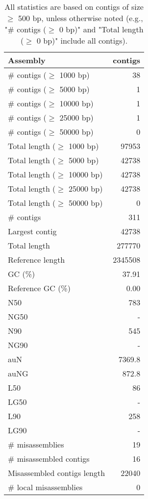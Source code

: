 \documentclass[12pt,a4paper]{article}
\begin{document}
\begin{table}[ht]
\begin{center}
\caption{All statistics are based on contigs of size $\geq$ 500 bp, unless otherwise noted (e.g., "\# contigs ($\geq$ 0 bp)" and "Total length ($\geq$ 0 bp)" include all contigs).}
\begin{tabular}{|l*{1}{|r}|}
\hline
Assembly & contigs \\ \hline
\# contigs ($\geq$ 1000 bp) & 38 \\ \hline
\# contigs ($\geq$ 5000 bp) & 1 \\ \hline
\# contigs ($\geq$ 10000 bp) & 1 \\ \hline
\# contigs ($\geq$ 25000 bp) & 1 \\ \hline
\# contigs ($\geq$ 50000 bp) & 0 \\ \hline
Total length ($\geq$ 1000 bp) & 97953 \\ \hline
Total length ($\geq$ 5000 bp) & 42738 \\ \hline
Total length ($\geq$ 10000 bp) & 42738 \\ \hline
Total length ($\geq$ 25000 bp) & 42738 \\ \hline
Total length ($\geq$ 50000 bp) & 0 \\ \hline
\# contigs & 311 \\ \hline
Largest contig & 42738 \\ \hline
Total length & 277770 \\ \hline
Reference length & 2345508 \\ \hline
GC (\%) & 37.91 \\ \hline
Reference GC (\%) & 0.00 \\ \hline
N50 & 783 \\ \hline
NG50 & - \\ \hline
N90 & 545 \\ \hline
NG90 & - \\ \hline
auN & 7369.8 \\ \hline
auNG & 872.8 \\ \hline
L50 & 86 \\ \hline
LG50 & - \\ \hline
L90 & 258 \\ \hline
LG90 & - \\ \hline
\# misassemblies & 19 \\ \hline
\# misassembled contigs & 16 \\ \hline
Misassembled contigs length & 22040 \\ \hline
\# local misassemblies & 0 \\ \hline

\end{tabular}
\end{center}
\end{table}
\end{document}
